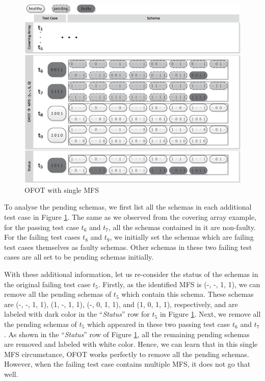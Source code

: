 \begin{figure}[ht]
 \centering
 \includegraphics[width=5.6in]{ofot_single.eps}
 \caption{OFOT with single MFS}
 \label{fig_ofot_single}
\end{figure}

To analyse the pending schemas, we first list all the schemas in each additional test case in Figure \ref{fig_ofot_single}. The same as we observed from the covering array example, for the passing test case $t_{6}$ and $t_{7}$, all the schemas contained in it are non-faulty. For the failing test cases $t_{8}$ and $t_{9}$, we initially set the schemas which are failing test cases themselves as faulty schemas. Other schemas in these two failing test cases are all set to be pending schemas initially.

With these additional information, let us re-consider the status of the schemas in the original failing test case $t_{5}$. Firstly, as the identified MFS is (-, -, 1, 1), we can remove all the pending schemas of $t_{5}$ which contain this schema. These schemas are (-, -, 1, 1), (1, -, 1, 1), (-, 0, 1, 1), and (1, 0, 1, 1), respectively, and are labeled with dark color in the  ``\emph{Status}'' row for $t_{5}$ in Figure \ref{fig_ofot_single}. Next, we remove all the pending schemas of $t_{5}$ which appeared in these two passing test case $t_{6}$ and $t_{7}$. As shown in the  ``\emph{Status}'' row of Figure \ref{fig_ofot_single}, all the remaining pending schemas are removed and labeled with white color. Hence, we can learn that in this single MFS circumstance, OFOT works perfectly to remove all the pending schemas. However, when the failing test case contains multiple MFS, it does not go that well.

